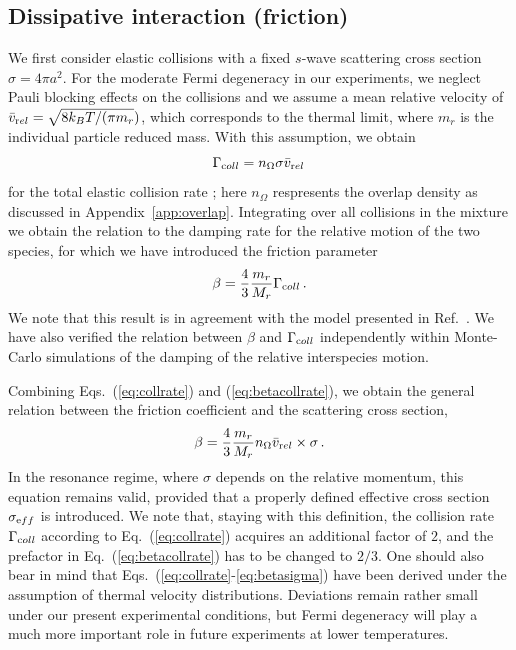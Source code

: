 \subsection{Dissipative interaction (friction)}
\label{app:beta}

We first consider elastic collisions with a fixed $s$-wave scattering cross section $\sigma = 4 \pi a^2$. For the moderate Fermi degeneracy in our experiments, we neglect Pauli blocking effects on the collisions and we assume a mean relative velocity of $\bar{v}_{\textrm rel} = \sqrt{8 k_B T/(\pi m_r})$, which corresponds to the thermal limit, where $m_r$ is the individual particle reduced mass. With this assumption, we obtain 
\begin{equation}
	\Gamma_{\textrm coll} = n_{\Omega} \sigma \bar{v}_{\textrm rel} \, 
	\label{eq:collrate}
\end{equation}
for the total elastic collision rate \cite{Mosk2001mou};
here $n_{\Omega}$ respresents the overlap density as discussed in Appendix~\ref{app:overlap}.
Integrating over all collisions in the mixture we obtain the relation to the damping rate for the relative motion of the two species, for which we have introduced the friction parameter
\begin{equation}
	\beta = \frac{4}{3} \frac{m_r}{M_r} \Gamma_{\textrm coll} \, .
	\label{eq:betacollrate}
\end{equation}
We note that this result is in agreement with the model presented in Ref.~\cite{Gensemer2001tfc}. We have also verified the relation between $\beta$ and $\Gamma_{\textrm coll}$ independently within Monte-Carlo simulations of the damping of the relative interspecies motion. %

Combining Eqs.~(\ref{eq:collrate}) and (\ref{eq:betacollrate}), we obtain the general relation between the friction coefficient and the scattering cross section,
\begin{equation}
	\beta = \frac{4}{3} \frac{m_r}{M_r} n_{\Omega}  \bar{v}_{\textrm rel} \times \sigma \, .
	\label{eq:betasigma}
\end{equation}
In the resonance regime, where $\sigma$ depends on the relative momentum, this equation remains valid, provided that
a properly defined effective cross section $\sigma_{\textrm eff}$ is introduced. We note that, staying with this definition, the collision rate $\Gamma_{\textrm coll}$ according to Eq.~(\ref{eq:collrate}) acquires an additional factor of $2$, and the prefactor in Eq.~(\ref{eq:betacollrate}) has to be changed to $2/3$. One should also bear in mind that Eqs.~(\ref{eq:collrate}-\ref{eq:betasigma}) have been derived under the assumption of thermal velocity distributions. Deviations remain rather small under our present experimental conditions, but Fermi degeneracy will play a much more important role in future experiments at lower temperatures.

